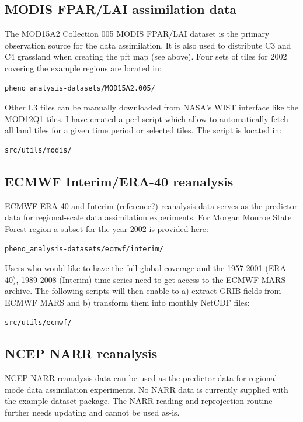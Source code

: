 \documentclass[a4paper,12pt]{article}
\begin{document}
\subsection{MODIS FPAR/LAI assimilation data}
The MOD15A2 Collection 005 MODIS FPAR/LAI dataset \citep{Myneni2002, Justice2002} is the primary observation source for the data assimilation. It is also used to distribute C3 and C4 grassland when creating the pft map (see above). Four sets of tiles for 2002 covering the example regions are located in:
\begin{verbatim}
pheno_analysis-datasets/MOD15A2.005/
\end{verbatim}
Other L3 tiles can be manually downloaded from NASA's WIST interface like the MOD12Q1 tiles. I have created a perl script which allow to automatically fetch all land tiles for a given time period or selected tiles. The script is located in:
\begin{verbatim}
src/utils/modis/
\end{verbatim}

\subsection{ECMWF Interim/ERA-40 reanalysis}

ECMWF ERA-40 \citep{Uppala2005} and Interim (reference?) reanalysis data serves as the predictor data for regional-scale data assimilation experiments. For Morgan Monroe State Forest region a subset for the year 2002 is provided here:
\begin{verbatim}
pheno_analysis-datasets/ecmwf/interim/
\end{verbatim}
Users who would like to have the full global coverage and the 1957-2001 (ERA-40), 1989-2008 (Interim) time series need to get access to the ECMWF MARS archive. The following scripts will then enable to a) extract GRIB fields from ECMWF MARS and b) transform them into monthly NetCDF files:
\begin{verbatim}
src/utils/ecmwf/
\end{verbatim}

\subsection{NCEP NARR reanalysis}
NCEP NARR reanalysis data \citep{Mesinger2006} can be used as the predictor data for regional-mode data assimilation experiments. No NARR data is currently supplied with the example dataset package. The NARR reading and reprojection routine further needs updating and cannot be used as-is.
\end{document}
